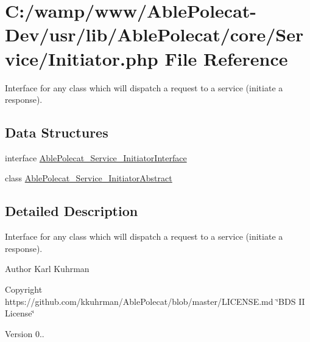 \hypertarget{_initiator_8php}{}\section{C\+:/wamp/www/\+Able\+Polecat-\/\+Dev/usr/lib/\+Able\+Polecat/core/\+Service/\+Initiator.php File Reference}
\label{_initiator_8php}


Interface for any class which will dispatch a request to a service (initiate a response).  


\subsection*{Data Structures}
\begin{DoxyCompactItemize}
\item 
interface \hyperlink{interface_able_polecat___service___initiator_interface}{Able\+Polecat\+\_\+\+Service\+\_\+\+Initiator\+Interface}
\item 
class \hyperlink{class_able_polecat___service___initiator_abstract}{Able\+Polecat\+\_\+\+Service\+\_\+\+Initiator\+Abstract}
\end{DoxyCompactItemize}


\subsection{Detailed Description}
Interface for any class which will dispatch a request to a service (initiate a response). 

\begin{DoxyAuthor}{Author}
Karl Kuhrman 
\end{DoxyAuthor}
\begin{DoxyCopyright}{Copyright}
https\+://github.com/kkuhrman/\+Able\+Polecat/blob/master/\+L\+I\+C\+E\+N\+S\+E.\+md \char`\"{}\+B\+D\+S I\+I License\char`\"{} 
\end{DoxyCopyright}
\begin{DoxyVersion}{Version}
0.. 
\end{DoxyVersion}
